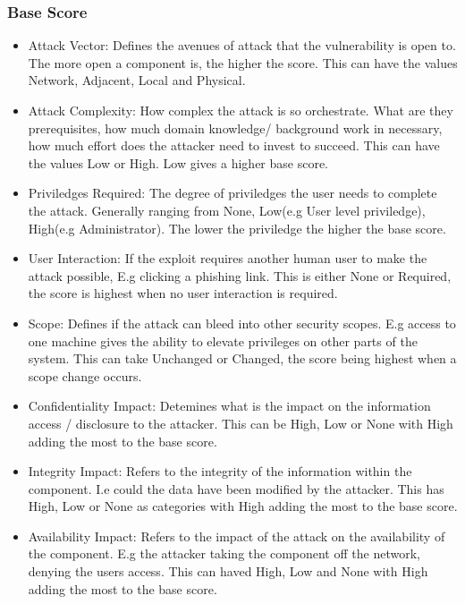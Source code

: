 \documentclass[12pt]{article}
\begin{document}
\subsubsection*{Base Score}

\begin{itemize}

	\item Attack Vector: Defines the avenues of attack that the vulnerability is open to. The more open a component is, the higher the score. This
	      can have the values Network, Adjacent, Local and Physical.

	\item Attack Complexity: How complex the attack is so orchestrate. What are they prerequisites, how much domain knowledge/ background work in
	      necessary, how much effort does the attacker need to invest to succeed. This can have the values Low or High. Low gives a higher base score.

	\item Priviledges Required: The degree of priviledges the user needs to complete the attack. Generally ranging from None, Low(e.g User level
	      priviledge), High(e.g Administrator). The lower the priviledge the higher the base score.

	\item User Interaction: If the exploit requires another human user to make the attack possible, E.g clicking a phishing link. This is either
	      None or Required, the score is highest when no user interaction is required.

	\item Scope: Defines if the attack can bleed into other security scopes. E.g access to one machine gives the ability to elevate privileges on
	      other parts of the system. This can take Unchanged or Changed, the score being highest when a scope change occurs.

	\item Confidentiality Impact: Detemines what is the impact on the information access / disclosure to the attacker. This can be High, Low or None
	      with High adding the most to the base score.

	\item Integrity Impact: Refers to the integrity of the information within the component. I.e could the data have been modified by the attacker.
	      This has High, Low or None as categories with High adding the most to the base score.

	\item Availability Impact: Refers to the impact of the attack on the availability of the component. E.g the attacker taking the component off
	      the network, denying the users access. This can haved High, Low and None with High adding the most to the base score.

\end{itemize}
\end{document}
